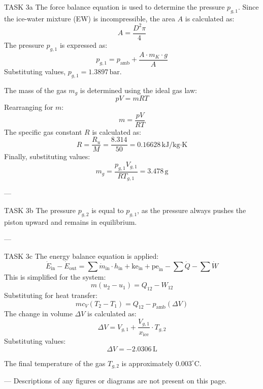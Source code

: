 TASK 3a  
The force balance equation is used to determine the pressure \( p_{g,1} \). Since the ice-water mixture (EW) is incompressible, the area \( A \) is calculated as:  
\[
A = \frac{D^2 \pi}{4}
\]  
The pressure \( p_{g,1} \) is expressed as:  
\[
p_{g,1} = p_{\text{amb}} + \frac{A \cdot m_K \cdot g}{A}
\]  
Substituting values, \( p_{g,1} = 1.3897 \, \text{bar} \).  

The mass of the gas \( m_g \) is determined using the ideal gas law:  
\[
pV = mRT
\]  
Rearranging for \( m \):  
\[
m = \frac{pV}{RT}
\]  
The specific gas constant \( R \) is calculated as:  
\[
R = \frac{R_u}{M} = \frac{8.314}{50} = 0.16628 \, \text{kJ/kg·K}
\]  
Finally, substituting values:  
\[
m_g = \frac{p_{g,1} V_{g,1}}{R T_{g,1}} = 3.478 \, \text{g}
\]  

---

TASK 3b  
The pressure \( p_{g,2} \) is equal to \( p_{g,1} \), as the pressure always pushes the piston upward and remains in equilibrium.  

---

TASK 3c  
The energy balance equation is applied:  
\[
\dot{E}_{\text{in}} - \dot{E}_{\text{out}} = \sum \dot{m}_{\text{in}} \cdot h_{\text{in}} + \text{ke}_{\text{in}} + \text{pe}_{\text{in}} - \sum \dot{Q} - \sum \dot{W}
\]  
This is simplified for the system:  
\[
m(u_2 - u_1) = Q_{12} - W_{12}
\]  
Substituting for heat transfer:  
\[
mc_V (T_2 - T_1) = Q_{12} - p_{\text{amb}} (\Delta V)
\]  
The change in volume \( \Delta V \) is calculated as:  
\[
\Delta V = V_{g,1} + \frac{V_{g,1}}{x_{\text{ice}}} \cdot T_{g,2}
\]  
Substituting values:  
\[
\Delta V = -2.0306 \, \text{L}
\]  

The final temperature of the gas \( T_{g,2} \) is approximately \( 0.003^\circ \text{C} \).  

---  
Descriptions of any figures or diagrams are not present on this page.